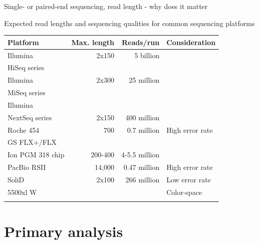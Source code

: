 \documentclass[presentation]{beamer}
\begin{document}
\begin{frame}[label=sec-1-1-4]{Single- or paired-end sequencing, read length - why does it matter}
\begin{center}
\begin{figure}[htb]
{
}
\end{figure}
\end{center}
\end{frame}

\begin{frame}[label=sec-1-1-5]{Expected read lengths and sequencing qualities for common sequencing platforms}
\begin{small}

\begin{center}
\begin{tabular}{l r r l}
\alert{Platform} & \alert{Max. length} & \alert{Reads/run} & \alert{Consideration} & \\
\hline
Illumina & 2x150 & 5 billion &  & \\
HiSeq series &  &  &  & \\
\hline
Illumina & 2x300 & 25 million &  & \\
MiSeq series &  &  &  & \\
\hline
Illumina &  &  &  & \\
NextSeq series & 2x150 & 400 million &  & \\
\hline
Roche 454 & 700 & 0.7 million & High error rate & \\
GS FLX+/FLX &  &  &  & \\
\hline
Ion  PGM    318 chip & 200-400 & 4-5.5   million &  & \\
\hline
PacBio RSII & 14,000 & 0.47 million & High error rate & \\
\hline
SoliD & 2x100 & 266 million & Low error rate & \\
5500xl W &  &  & Color-space & \\
 &  &  &  & \\
\end{tabular}
\end{center}

\end{small}
\end{frame}


\section{Primary analysis}
\label{sec-2}
\end{document}
